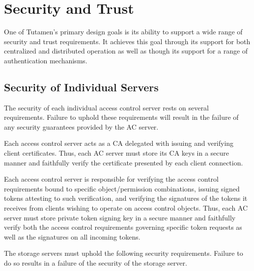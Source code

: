 \section{Security and Trust}
\label{chap:tutamen:trust}

One of Tutamen's primary design goals is its ability to support a wide
range of security and trust requirements. It achieves this goal
through its support for both centralized and distributed operation as
well as though its support for a range of authentication mechanisms.

\subsection{Security of Individual Servers}

The security of each individual access control server rests on several
requirements. Failure to uphold these requirements will result in the
failure of any security guarantees provided by the AC server.

\begin{packed_desc}
\item[Certificate Authority Role:] Each access control server acts as
  a CA delegated with issuing and verifying client certificates. Thus,
  each AC server must store its CA keys in a secure manner and
  faithfully verify the certificate presented by each client
  connection.
\item[Token Issuance and Verification:] Each access control server is
  responsible for verifying the access control requirements bound to
  specific object/permission combinations, issuing signed tokens
  attesting to such verification, and verifying the signatures of the
  tokens it receives from clients wishing to operate on access control
  objects. Thus, each AC server must store private token signing key
  in a secure manner and faithfully verify both the access control
  requirements governing specific token requests as well as the
  signatures on all incoming tokens.
\end{packed_desc}

The storage servers must uphold the following security
requirements. Failure to do so results in a failure of the security of
the storage server.

